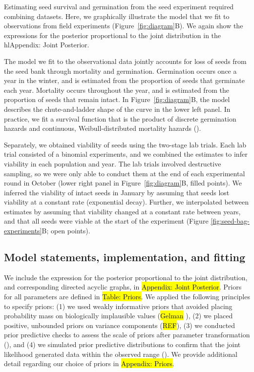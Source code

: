 \documentclass[12pt, oneside, titlepage]{article}   	%
\begin{document}
Estimating seed survival and germination from the seed experiment required combining datasets. Here, we graphically illustrate the model that we fit to observations from field experiments (Figure~\ref{fig:diagram}B). We again show the expressions for the posterior proportional to the joint distribution in the hl{Appendix: Joint Posterior}. 

The model we fit to the observational data jointly accounts for loss of seeds from the seed bank through mortality and germination. Germination occurs once a year in the winter, and is estimated from the proportion of seeds that germinate each year. Mortality occurs throughout the year, and is estimated from the proportion of seeds that remain intact. In Figure~\ref{fig:diagram}B, the model describes the chute-and-ladder shape of the curve in the lower left panel. In practice, we fit a survival function that is the product of discrete germination hazards and continuous, Weibull-distributed mortality hazards (\cite{klein2003}). 

Separately, we obtained viability of seeds using the two-stage lab trials. Each lab trial consisted of a binomial experiments, and we combined the estimates to infer viability in each population and year. The lab trials involved destructive sampling, so we were only able to conduct them at the end of each experimental round in October (lower right panel in Figure~\ref{fig:diagram}B, filled points). We inferred the viability of intact seeds in January by assuming that seeds lost viability at a constant rate (exponential decay). Further, we interpolated between estimates by assuming that viability changed at a constant rate between years, and that all seeds were viable at the start of the experiment (Figure \ref{fig:seed-bag-experiments}B; open points). 

\subsection{Model statements, implementation, and fitting}

We include the expression for the posterior proportional to the joint distribution, and corresponding directed acyclic graphs, in \hl{Appendix: Joint Posterior}. Priors for all parameters are defined in \hl{Table: Priors}. We applied the following principles to specify priors: (1) we used weakly informative priors that avoided placing probability mass on biologically implausible values (\hl{Gelman} \cite{lemoine2019,wesner2020}), (2) we placed positive, unbounded priors on variance components (\hl{REF}), (3) we conducted prior predictive checks to assess the scale of priors after parameter transformation (\cite{hobbs2015b,gabry2019,wesner2020}), and (4) we simulated prior predictive distributions to confirm that the joint likelihood generated data within the observed range (\cite{gabry2019,conn2018,hobbs2015b}). We provide additional detail regarding our choice of priors in \hl{Appendix: Priors}. 
\end{document}

